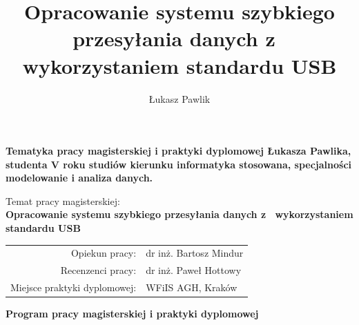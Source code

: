 \documentclass{BscUS}
\title{Opracowanie systemu szybkiego przesyłania danych z~ wykorzystaniem standardu USB}
\author{Łukasz Pawlik}
\begin{document}
\pagestyle{plain}

\maketitle

\makestatement

\newpage

\begin{flushleft}
{\bf Tematyka pracy magisterskiej i praktyki dyplomowej Łukasza Pawlika, studenta V roku studiów kierunku informatyka stosowana, specjalności modelowanie i analiza danych.}\\
\end{flushleft}
\begin{flushleft}
Temat pracy magisterskiej:\\
{\bf Opracowanie systemu szybkiego przesyłania danych z~ wykorzystaniem standardu USB}\\
\end{flushleft}
\begin{tabular}{rl}

Opiekun pracy:                  & dr inż. Bartosz Mindur\\
Recenzenci pracy:               & dr inż. Paweł Hottowy \\
Miejsce praktyki dyplomowej:    & WFiIS AGH, Kraków\\
\end{tabular}

\begin{center}
{\bf Program pracy magisterskiej i praktyki dyplomowej}
\end{center}
\end{document}
